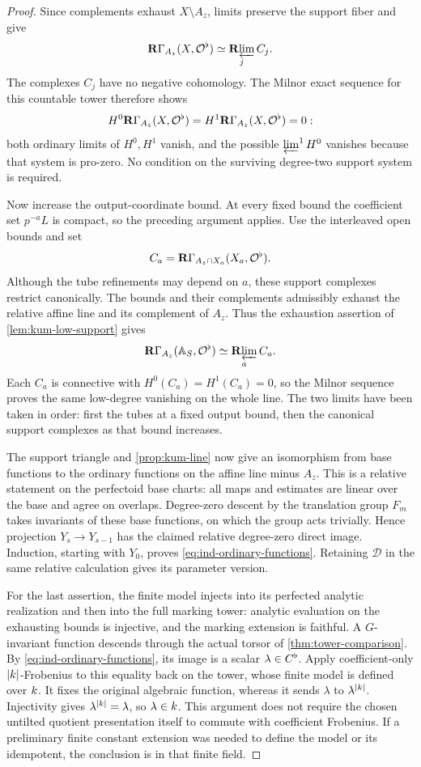\begin{proof}
Since complements exhaust $X\setminus A_z$, limits
preserve the support fiber and give
\begin{equation}
 \label{eq:ind-closed-support-limit}
 \mathbf R\Gamma_{A_z}(X,\mathcal O^\flat)
       \simeq \mathop{\mathbf R\!\varprojlim}_j C_j.
\end{equation}
The complexes $C_j$ have no negative cohomology.
The Milnor exact sequence for this countable tower
therefore shows
\[
 H^0\mathbf R\Gamma_{A_z}(X,\mathcal O^\flat)
   =H^1\mathbf R\Gamma_{A_z}(X,\mathcal O^\flat)=0:
\]
both ordinary limits of $H^0,H^1$ vanish, and the
possible $\varprojlim^1 H^0$ vanishes because that
system is pro-zero.  No condition on the surviving
degree-two support system is required.

Now increase the output-coordinate bound.  At every fixed bound
the coefficient set $p^{-a}L$ is compact, so the preceding argument
applies.  Use the interleaved open bounds and set
\[
 C_a=\mathbf R\Gamma_{A_z\cap X_a}(X_a,\mathcal O^\flat).
\]
Although the tube refinements may depend on $a$, these support
complexes restrict canonically.  The bounds and their complements
admissibly exhaust the relative affine line and its complement of
$A_z$.  Thus the exhaustion assertion of \cref{lem:kum-low-support}
gives
\[
 \mathbf R\Gamma_{A_z}(\mathbb A_S,\mathcal O^\flat)
       \simeq\mathop{\mathbf R\!\varprojlim}_a C_a.
\]
Each $C_a$ is connective with $H^0(C_a)=H^1(C_a)=0$, so the Milnor
sequence proves the same low-degree vanishing on the whole line.
The two limits have been taken in order: first the tubes at a fixed
output bound, then the canonical support complexes as that bound
increases.

The support triangle and \cref{prop:kum-line} now
give an isomorphism from base functions to the
ordinary functions on the affine line minus
$A_z$.  This is a relative statement on the
perfectoid base charts: all maps and estimates
are linear over the base and agree on overlaps.
Degree-zero descent by the translation group
$F_m$ takes invariants of these base functions,
on which the group acts trivially.  Hence
projection $Y_s\to Y_{s-1}$ has the claimed
relative degree-zero direct image.  Induction,
starting with $Y_0$, proves
\cref{eq:ind-ordinary-functions}.  Retaining
$\mathcal D$ in the same relative calculation
gives its parameter version.

For the last assertion, the finite model injects
into its perfected analytic realization and
then into the full marking tower: analytic
evaluation on the exhausting bounds is
injective, and the marking extension is
faithful.  A $G$-invariant function descends
through the actual torsor of
\cref{thm:tower-comparison}.  By
\cref{eq:ind-ordinary-functions}, its image is
a scalar $\lambda\in C^\flat$.  Apply
coefficient-only $|k|$-Frobenius to this
equality back on the tower, whose finite
model is defined over $k$.  It fixes the
original algebraic function, whereas it
sends $\lambda$ to $\lambda^{|k|}$.
Injectivity gives
$\lambda^{|k|}=\lambda$, so
$\lambda\in k$.  This argument does not
require the chosen untilted quotient
presentation itself to commute with
coefficient Frobenius.  If a preliminary
finite constant extension was needed to
define the model or its idempotent, the
conclusion is in that finite field.
\end{proof}

